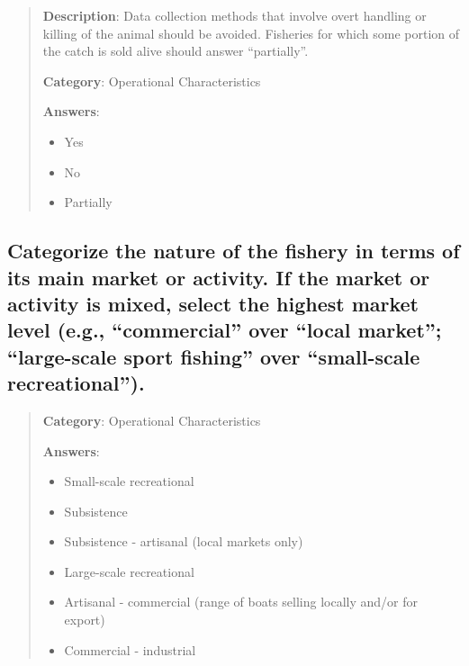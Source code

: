 \documentclass[11pt,]{book}
\providecommand{\tightlist}{%
  \setlength{\itemsep}{0pt}\setlength{\parskip}{0pt}}
\begin{document}
\begin{quote}
\textbf{Description}: Data collection methods that involve overt
handling or killing of the animal should be avoided. Fisheries for which
some portion of the catch is sold alive should answer ``partially''.

\textbf{Category}: Operational Characteristics

\textbf{Answers}:

\begin{itemize}
\tightlist
\item
  Yes
\item
  No
\item
  Partially
\end{itemize}
\end{quote}

\hypertarget{categorize-the-nature-of-the-fishery-in-terms-of-its-main-market-or-activity.-if-the-market-or-activity-is-mixed-select-the-highest-market-level-e.g.-commercial-over-local-market-large-scale-sport-fishing-over-small-scale-recreational.}{%
\subsection*{Categorize the nature of the fishery in terms of its main
market or activity. If the market or activity is mixed, select the
highest market level (e.g., ``commercial'' over ``local market'';
``large-scale sport fishing'' over ``small-scale
recreational'').}\label{categorize-the-nature-of-the-fishery-in-terms-of-its-main-market-or-activity.-if-the-market-or-activity-is-mixed-select-the-highest-market-level-e.g.-commercial-over-local-market-large-scale-sport-fishing-over-small-scale-recreational.}}

\begin{quote}
\textbf{Category}: Operational Characteristics

\textbf{Answers}:

\begin{itemize}
\tightlist
\item
  Small-scale recreational
\item
  Subsistence
\item
  Subsistence - artisanal (local markets only)
\item
  Large-scale recreational
\item
  Artisanal - commercial (range of boats selling locally and/or for
  export)
\item
  Commercial - industrial
\end{itemize}
\end{quote}
\end{document}
